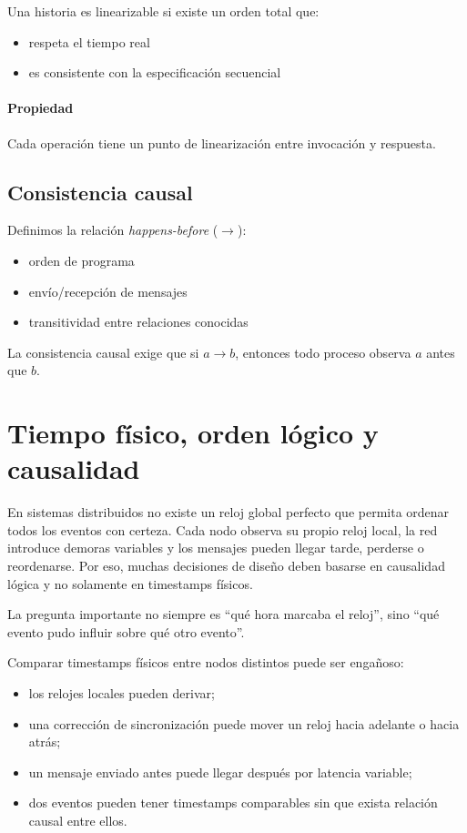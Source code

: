 \documentclass[variant=apuntes,cover=institutional,mode=screen]{ua-engineering-v6-article}
\begin{document}
Una historia es linearizable si existe un orden total que:
\begin{itemize}
\item respeta el tiempo real
\item es consistente con la especificación secuencial
\end{itemize}

\paragraph{Propiedad}
Cada operación tiene un punto de linearización entre invocación y respuesta.

\subsection{Consistencia causal}

Definimos la relación \emph{happens-before} ($\rightarrow$):
\begin{itemize}
\item orden de programa
\item envío/recepción de mensajes
\item transitividad entre relaciones conocidas
\end{itemize}

La consistencia causal exige que si $a \rightarrow b$, entonces todo proceso observa $a$ antes que $b$.

\section{Tiempo físico, orden lógico y causalidad}

En sistemas distribuidos no existe un reloj global perfecto que permita ordenar todos los eventos con certeza. Cada nodo observa su propio reloj local, la red introduce demoras variables y los mensajes pueden llegar tarde, perderse o reordenarse. Por eso, muchas decisiones de diseño deben basarse en causalidad lógica y no solamente en timestamps físicos.

\begin{uakeybox}
La pregunta importante no siempre es ``qué hora marcaba el reloj'', sino ``qué evento pudo influir sobre qué otro evento''.
\end{uakeybox}

Comparar timestamps físicos entre nodos distintos puede ser engañoso:
\begin{itemize}
\item los relojes locales pueden derivar;
\item una corrección de sincronización puede mover un reloj hacia adelante o hacia atrás;
\item un mensaje enviado antes puede llegar después por latencia variable;
\item dos eventos pueden tener timestamps comparables sin que exista relación causal entre ellos.
\end{itemize}
\end{document}
